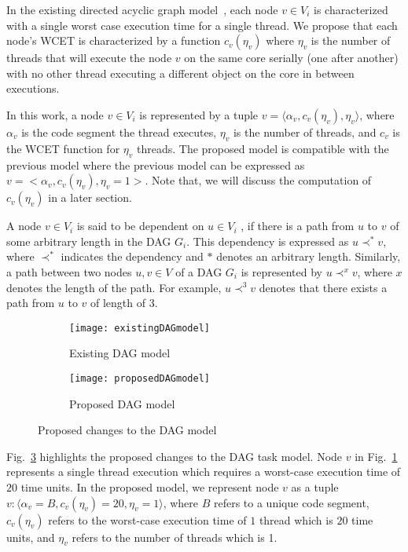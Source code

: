 In the existing directed acyclic graph model~\cite{li2014analysis}, each node ${v \in V_i}$ is characterized
with a single worst case execution time for a single thread. We
propose that each node's WCET is characterized by a function
${c_{v}(\eta_{v})}$ where $\eta_{v}$ is the number of threads that will execute the
node ${v}$ on the same core serially (one after another) with no
other thread executing a different object on the core in between executions.

In this work, a node ${v \in V_i}$ is represented by a tuple ${v = \langle \alpha_{v}, c_{v}(\eta_{v}), \eta_{v} \rangle }$, where $\alpha_{v}$ is the code segment the thread executes, $\eta_{v}$ is the number of threads, and ${c_{v}}$ is the WCET function for ${\eta_v}$ threads. The proposed model is  compatible with the previous model \cite{li2014analysis} where the previous model can be expressed as ${v = <\alpha_{v}, c_{v}(\eta_v), \eta_v=1>}$. Note that, we will discuss the computation of $c_{v}(\eta_{v})$ in a later section.

A node $v \in V_i$ is said to be dependent on $u \in V_i$ , if there is a path from $u$ to $v$ of some arbitrary length in the DAG $G_i$. This dependency is expressed as \textbf{${u \prec^* v}$}, where $\prec^*$ indicates the dependency and $*$ denotes an arbitrary length. Similarly, a path between two nodes $u, v \in V$ of a DAG $G_i$ is represented by $u \prec^{x} v$, where $x$ denotes the length of the path. For example, $u \prec^{3} v$ denotes that there exists a path from $u$ to $v$ of length of 3.


\begin{figure}
  \centering
  \begin{subfigure}[b]{0.4\textwidth}{
      \texttt{[image: existingDAGmodel]}
      \caption{Existing DAG model}
      \label{fig:existingDAGmodel}
    }
  \end{subfigure} \quad
  \begin{subfigure}[b]{0.4\textwidth}{
      \texttt{[image: proposedDAGmodel]}
      \caption{Proposed DAG model}
      \label{fig:proposedDAGmodel}
    }
  \end{subfigure}
  \caption{Proposed changes to the DAG model}
  \label{fig:dag-change}
\end{figure}


Fig.~\ref{fig:dag-change} highlights the proposed changes to the DAG task model.  Node $v$ in Fig.~\ref{fig:existingDAGmodel} represents a single thread execution which requires a worst-case execution time of $20$ time units. In the proposed model, we represent node $v$ as a tuple $v : \langle \alpha_v = B, c_v(\eta_v) = 20,  \eta_v = 1\rangle$, where $B$ refers to a unique code segment, $ c_v(\eta_v)$ refers to the worst-case execution time of $1$ thread which is $20$ time units, and $\eta_v$ refers to the number of threads which is 1.

